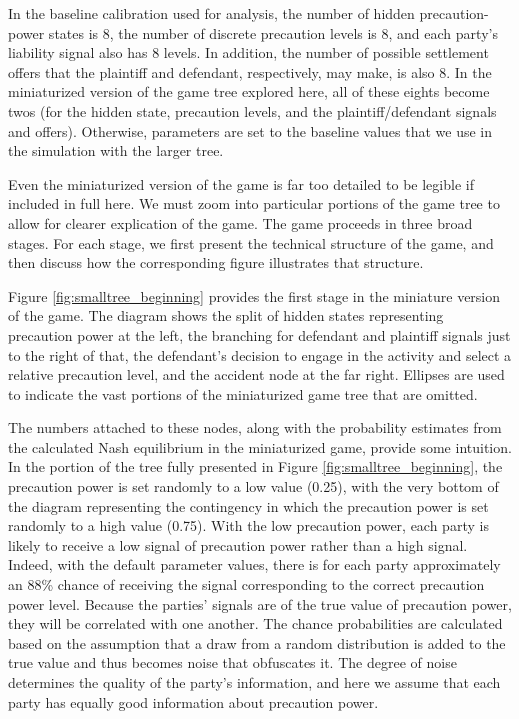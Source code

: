 \documentclass{article}
\begin{document}
In the baseline calibration used for analysis, the number of hidden precaution-power states is $8$, the number of discrete precaution levels is $8$, and each party’s liability signal also has $8$ levels. In addition, the number of possible settlement offers that the plaintiff and defendant, respectively, may make, is also $8$. In the miniaturized version of the game tree explored here, all of these eights become twos (for the hidden state, precaution levels, and the plaintiff/defendant signals and offers). Otherwise, parameters are set to the baseline values that we use in the simulation with the larger tree. 

Even the miniaturized version of the game is far too detailed to be legible if included in full here. We must zoom into particular portions of the game tree to allow for clearer explication of the game. The game proceeds in three broad stages. For each stage, we first present the technical structure of the game, and then discuss how the corresponding figure illustrates that structure. 

Figure \ref{fig:smalltree_beginning} provides the first stage in the miniature version of the game. The diagram shows the split of hidden states representing precaution power at the left, the branching for defendant and plaintiff signals just to the right of that, the defendant’s decision to engage in the activity and select a relative precaution level, and the accident node at the far right. Ellipses are used to indicate the vast portions of the miniaturized game tree that are omitted. 

The numbers attached to these nodes, along with the probability estimates from the calculated Nash equilibrium in the miniaturized game, provide some intuition. In the portion of the tree fully presented in Figure \ref{fig:smalltree_beginning}, the precaution power is set randomly to a low value (0.25), with the very bottom of the diagram representing the contingency in which the precaution power is set randomly to a high value (0.75). With the low precaution power, each party is likely to receive a low signal of precaution power rather than a high signal. Indeed, with the default parameter values, there is for each party approximately an 88\% chance of receiving the signal corresponding to the correct precaution power level. Because the parties' signals are of the true value of precaution power, they will be correlated with one another. The chance probabilities are calculated based on the assumption that a draw from a random distribution is added to the true value and thus becomes noise that obfuscates it. The degree of noise determines the quality of the party's information, and here we assume that each party has equally good information about precaution power.
\end{document}
